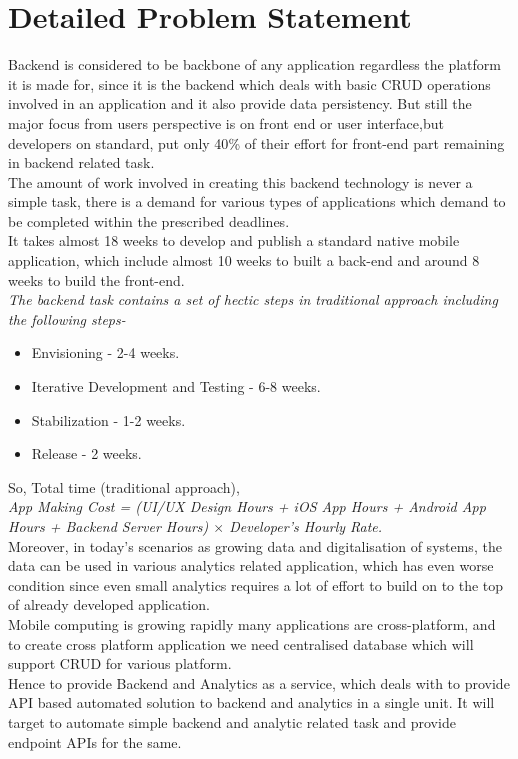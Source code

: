 \documentclass[a4paper,12pt]{report}
\begin{document}
    \section{Detailed Problem Statement}
    \label{sec:theory}
    Backend is considered to be backbone of any application regardless the platform it is made for, since it is the backend which deals with basic CRUD operations involved in an application and it also provide data persistency. But still the major focus from users perspective is on front end or user interface,but developers on standard, put only 40{\%} of their effort for front-end part remaining in backend related task. \\
    The amount of work involved in creating this backend technology is never a simple task, there is a demand for various types of applications which demand to be completed within the prescribed deadlines. \\
    It takes almost 18 weeks to develop and publish a standard native mobile application, which include almost 10 weeks to built a back-end and around 8 weeks to build the front-end.\\    
    \emph { The backend task contains a set of hectic steps in traditional approach including the following steps-}
    \vspace{-0.50cm}
    \begin{itemize}
      \item {Envisioning - 2-4 weeks. }
      \item {Iterative Development and Testing - 6-8 weeks. }
      \item {Stabilization - 1-2 weeks.}
      \item {Release - 2 weeks. }
    \end{itemize} 
    \vspace{-0.50cm}   
    So, Total time (traditional approach), \\
    \emph{
      App Making Cost = (UI/UX Design Hours + iOS App Hours + Android App Hours + Backend Server Hours)
      $ \times $ Developer’s Hourly Rate.
        } \\
        \vfill
    Moreover, in today’s scenarios as growing data and digitalisation of systems, the data can be used in various analytics related application, which has even worse condition since even small analytics requires a lot of effort to build on to the top of already developed application.\\    
    Mobile computing is growing rapidly many applications are cross-platform, and to create cross platform application we need centralised database which will support CRUD for various platform.\\
    Hence to provide Backend and Analytics as a service, which deals with to provide API based automated solution to backend and analytics in a single unit. It will target to automate simple backend and analytic related task and provide endpoint APIs for the same.\\    
\end{document}
